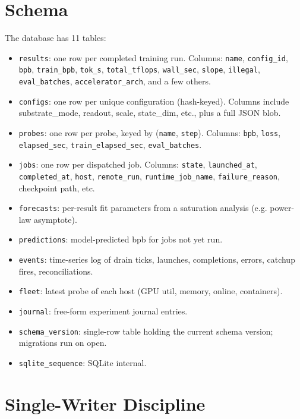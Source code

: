 \documentclass[11pt,openany]{book}
\theoremstyle{definition}
\theoremstyle{plain}
\begin{document}
\section{Schema}

The database has 11 tables:

\begin{itemize}
  \item \texttt{results}: one row per completed training run.
    Columns: \texttt{name}, \texttt{config\_id}, \texttt{bpb},
    \texttt{train\_bpb}, \texttt{tok\_s}, \texttt{total\_tflops},
    \texttt{wall\_sec}, \texttt{slope}, \texttt{illegal},
    \texttt{eval\_batches}, \texttt{accelerator\_arch}, and a few others.
  \item \texttt{configs}: one row per unique configuration (hash-keyed).
    Columns include substrate\_mode, readout, scale, state\_dim, etc.,
    plus a full JSON blob.
  \item \texttt{probes}: one row per probe, keyed by (\texttt{name},
    \texttt{step}). Columns: \texttt{bpb}, \texttt{loss},
    \texttt{elapsed\_sec}, \texttt{train\_elapsed\_sec},
    \texttt{eval\_batches}.
  \item \texttt{jobs}: one row per dispatched job. Columns:
    \texttt{state}, \texttt{launched\_at}, \texttt{completed\_at},
    \texttt{host}, \texttt{remote\_run}, \texttt{runtime\_job\_name},
    \texttt{failure\_reason}, checkpoint path, etc.
  \item \texttt{forecasts}: per-result fit parameters from a saturation
    analysis (e.g. power-law asymptote).
  \item \texttt{predictions}: model-predicted bpb for jobs not yet run.
  \item \texttt{events}: time-series log of drain ticks, launches,
    completions, errors, catchup fires, reconciliations.
  \item \texttt{fleet}: latest probe of each host (GPU util, memory,
    online, containers).
  \item \texttt{journal}: free-form experiment journal entries.
  \item \texttt{schema\_version}: single-row table holding the current
    schema version; migrations run on open.
  \item \texttt{sqlite\_sequence}: SQLite internal.
\end{itemize}

\section{Single-Writer Discipline}
\end{document}
